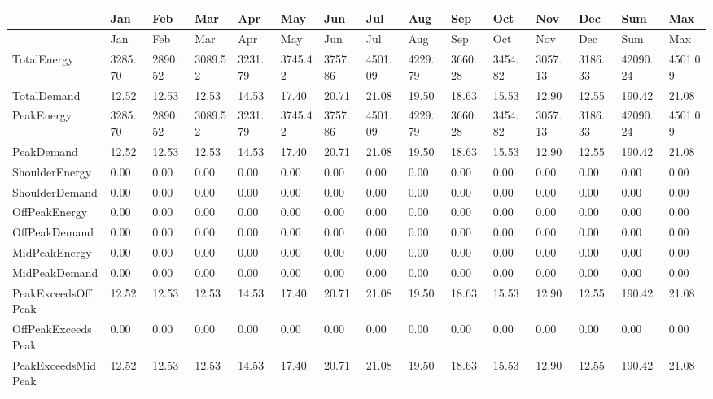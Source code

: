 {\tiny
\begin{longtable}[c]{>{\raggedright}p{0.4in}>{\raggedright}p{0.4in}>{\raggedright}p{0.4in}>{\raggedright}p{0.4in}>{\raggedright}p{0.4in}>{\raggedright}p{0.4in}>{\raggedright}p{0.4in}>{\raggedright}p{0.4in}>{\raggedright}p{0.4in}>{\raggedright}p{0.4in}>{\raggedright}p{0.4in}>{\raggedright}p{0.4in}>{\raggedright}p{0.4in}>{\raggedright}p{0.4in}>{\raggedright}p{0.4in}}
\toprule
~ & Jan & Feb & Mar & Apr & May & Jun & Jul & Aug & Sep & Oct & Nov & Dec & Sum & Max \tabularnewline
\midrule
\endfirsthead

\toprule
~ & Jan & Feb & Mar & Apr & May & Jun & Jul & Aug & Sep & Oct & Nov & Dec & Sum & Max \tabularnewline
\midrule
\endhead

Total\-Energy & 3285.70 & 2890.52 & 3089.52 & 3231.79 & 3745.42 & 3757.86 & 4501.09 & 4229.79 & 3660.28 & 3454.82 & 3057.13 & 3186.33 & 42090.24 & 4501.09 \tabularnewline
Total\-Demand & 12.52 & 12.53 & 12.53 & 14.53 & 17.40 & 20.71 & 21.08 & 19.50 & 18.63 & 15.53 & 12.90 & 12.55 & 190.42 & 21.08 \tabularnewline
Peak\-Energy & 3285.70 & 2890.52 & 3089.52 & 3231.79 & 3745.42 & 3757.86 & 4501.09 & 4229.79 & 3660.28 & 3454.82 & 3057.13 & 3186.33 & 42090.24 & 4501.09 \tabularnewline
Peak\-Demand & 12.52 & 12.53 & 12.53 & 14.53 & 17.40 & 20.71 & 21.08 & 19.50 & 18.63 & 15.53 & 12.90 & 12.55 & 190.42 & 21.08 \tabularnewline
Shoulder\-Energy & 0.00 & 0.00 & 0.00 & 0.00 & 0.00 & 0.00 & 0.00 & 0.00 & 0.00 & 0.00 & 0.00 & 0.00 & 0.00 & 0.00 \tabularnewline
Shoulder\-Demand & 0.00 & 0.00 & 0.00 & 0.00 & 0.00 & 0.00 & 0.00 & 0.00 & 0.00 & 0.00 & 0.00 & 0.00 & 0.00 & 0.00 \tabularnewline
OffPeak\-Energy & 0.00 & 0.00 & 0.00 & 0.00 & 0.00 & 0.00 & 0.00 & 0.00 & 0.00 & 0.00 & 0.00 & 0.00 & 0.00 & 0.00 \tabularnewline
OffPeak\-Demand & 0.00 & 0.00 & 0.00 & 0.00 & 0.00 & 0.00 & 0.00 & 0.00 & 0.00 & 0.00 & 0.00 & 0.00 & 0.00 & 0.00 \tabularnewline
MidPeak\-Energy & 0.00 & 0.00 & 0.00 & 0.00 & 0.00 & 0.00 & 0.00 & 0.00 & 0.00 & 0.00 & 0.00 & 0.00 & 0.00 & 0.00 \tabularnewline
MidPeak\-Demand & 0.00 & 0.00 & 0.00 & 0.00 & 0.00 & 0.00 & 0.00 & 0.00 & 0.00 & 0.00 & 0.00 & 0.00 & 0.00 & 0.00 \tabularnewline
Peak\-Exceeds\-OffPeak & 12.52 & 12.53 & 12.53 & 14.53 & 17.40 & 20.71 & 21.08 & 19.50 & 18.63 & 15.53 & 12.90 & 12.55 & 190.42 & 21.08 \tabularnewline
OffPeak\-Exceeds\-Peak & 0.00 & 0.00 & 0.00 & 0.00 & 0.00 & 0.00 & 0.00 & 0.00 & 0.00 & 0.00 & 0.00 & 0.00 & 0.00 & 0.00 \tabularnewline
Peak\-Exceeds\-Mid\-Peak & 12.52 & 12.53 & 12.53 & 14.53 & 17.40 & 20.71 & 21.08 & 19.50 & 18.63 & 15.53 & 12.90 & 12.55 & 190.42 & 21.08 \tabularnewline

\end{longtable}}
